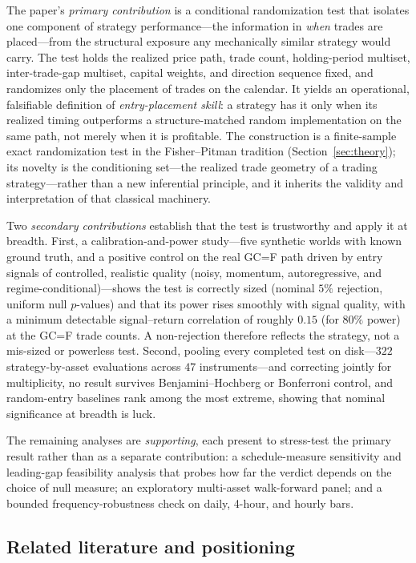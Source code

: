 \documentclass[preprint,12pt]{elsarticle}
\theoremstyle{definition}
\begin{document}
The paper's \emph{primary contribution} is a conditional randomization test that isolates one component of strategy performance---the information in \emph{when} trades are placed---from the structural exposure any mechanically similar strategy would carry. The test holds the realized price path, trade count, holding-period multiset, inter-trade-gap multiset, capital weights, and direction sequence fixed, and randomizes only the placement of trades on the calendar. It yields an operational, falsifiable definition of \emph{entry-placement skill}: a strategy has it only when its realized timing outperforms a structure-matched random implementation on the same path, not merely when it is profitable. The construction is a finite-sample exact randomization test in the Fisher--Pitman tradition (Section~\ref{sec:theory}); its novelty is the conditioning set---the realized trade geometry of a trading strategy---rather than a new inferential principle, and it inherits the validity and interpretation of that classical machinery.

Two \emph{secondary contributions} establish that the test is trustworthy and apply it at breadth. First, a calibration-and-power study---five synthetic worlds with known ground truth, and a positive control on the real GC=F path driven by entry signals of controlled, realistic quality (noisy, momentum, autoregressive, and regime-conditional)---shows the test is correctly sized (nominal $5\%$ rejection, uniform null $p$-values) and that its power rises smoothly with signal quality, with a minimum detectable signal--return correlation of roughly $0.15$ (for $80\%$ power) at the GC=F trade counts. A non-rejection therefore reflects the strategy, not a mis-sized or powerless test. Second, pooling every completed test on disk---$322$ strategy-by-asset evaluations across $47$ instruments---and correcting jointly for multiplicity, no result survives Benjamini--Hochberg or Bonferroni control, and random-entry baselines rank among the most extreme, showing that nominal significance at breadth is luck.

The remaining analyses are \emph{supporting}, each present to stress-test the primary result rather than as a separate contribution: a schedule-measure sensitivity and leading-gap feasibility analysis that probes how far the verdict depends on the choice of null measure; an exploratory multi-asset walk-forward panel; and a bounded frequency-robustness check on daily, 4-hour, and hourly bars.

\subsection{Related literature and positioning}
\end{document}

